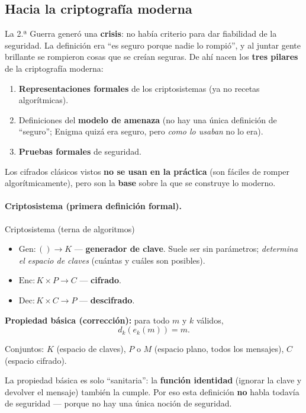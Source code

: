 \documentclass[../main.tex]{subfiles}
\begin{document}
\subsection{Hacia la criptografía moderna}

La 2.ª Guerra generó una \textbf{crisis}: no había criterio para dar fiabilidad
de la seguridad. La definición era ``es seguro porque nadie lo rompió'', y al
juntar gente brillante se rompieron cosas que se creían seguras. De ahí nacen
los \textbf{tres pilares} de la criptografía moderna:
\begin{enumerate}[nosep]
  \item \textbf{Representaciones formales} de los criptosistemas (ya no recetas
        algorítmicas).
  \item Definiciones del \textbf{modelo de amenaza} (no hay una única definición
        de ``seguro''; Enigma quizá era seguro, pero \emph{como lo usaban} no lo
        era).
  \item \textbf{Pruebas formales} de seguridad.
\end{enumerate}
Los cifrados clásicos vistos \textbf{no se usan en la práctica} (son fáciles de
romper algorítmicamente), pero son la \textbf{base} sobre la que se construye lo
moderno.

\paragraph{Criptosistema (primera definición formal).}
\begin{definicion}{Criptosistema (terna de algoritmos)}
\begin{itemize}[nosep]
  \item $\text{Gen}: () \to K$ \quad — \textbf{generador de clave}. Suele ser
        sin parámetros; \emph{determina el espacio de claves} (cuántas y cuáles
        son posibles).
  \item $\text{Enc}: K \times P \to C$ \quad — \textbf{cifrado}.
  \item $\text{Dec}: K \times C \to P$ \quad — \textbf{descifrado}.
\end{itemize}
\textbf{Propiedad básica (corrección):} para todo $m$ y $k$ válidos,
$$d_k(e_k(m)) = m.$$
\end{definicion}
Conjuntos: $K$ (espacio de claves), $P$ o $M$ (espacio plano, todos los
mensajes), $C$ (espacio cifrado).

\begin{ojo}
La propiedad básica es solo ``sanitaria'': la \textbf{función identidad}
(ignorar la clave y devolver el mensaje) también la cumple. Por eso esta
definición \textbf{no} habla todavía de seguridad — porque no hay una única
noción de seguridad.
\end{ojo}
\end{document}
